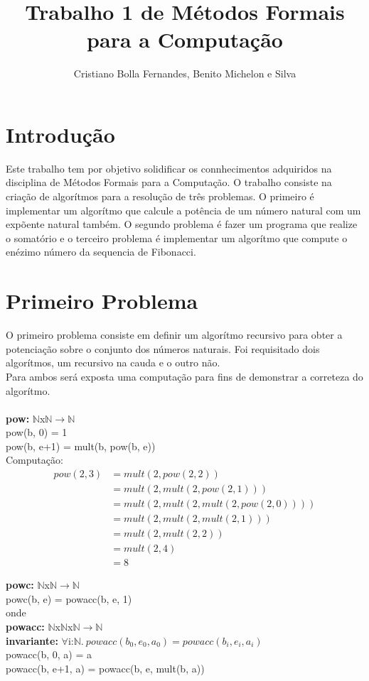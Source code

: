\documentclass{article}
\title{Trabalho 1 de Métodos Formais para a Computação}
\author{Cristiano Bolla Fernandes, Benito Michelon e Silva}
\begin{document}
\maketitle

\section{Introdução}
Este trabalho tem por objetivo solidificar os connhecimentos adquiridos na disciplina de Métodos Formais para a Computação.
O trabalho consiste na criação de algorítmos para a resolução de três problemas. O primeiro é implementar um algorítmo que calcule a
potência de um número natural com um expõente natural também. O segundo problema é fazer um programa que realize o somatório e o
terceiro problema é implementar um algorítmo que compute o enézimo número da sequencia de Fibonacci.

\section{Primeiro Problema}
O primeiro problema consiste em definir um algorítmo recursivo para obter a potenciação sobre o conjunto dos números naturais.
Foi requisitado dois algorítmos, um recursivo na cauda e o outro não.\\
Para ambos será exposta uma computação para fins de demonstrar a correteza do algorítmo.\\
\\
\textbf{pow:} $\mathbb{N}$x$\mathbb{N}$$ \rightarrow \mathbb{N}$\\
pow(b, 0) = 1\\
pow(b, e+1) = mult(b, pow(b, e))\\

Computação:\\
\begin{align*}
pow(2,3) &= mult(2, pow(2, 2))\\
&= mult(2, mult(2, pow(2, 1)))\\
&= mult(2, mult(2, mult(2, pow(2, 0))))\\
&= mult(2, mult(2, mult(2, 1)))\\
&= mult(2, mult(2, 2))\\
&= mult(2, 4)\\
&= 8
\end{align*}

\noindent \textbf{powc:} $\mathbb{N}$x$\mathbb{N}$$ \rightarrow \mathbb{N}$\\
powc(b, e) = powacc(b, e, 1)\\
onde\\
\indent \textbf{powacc:} $\mathbb{N}$x$\mathbb{N}$x$\mathbb{N}$$ \rightarrow \mathbb{N}$\\
\indent \textbf{invariante:} $\forall$i:$\mathbb{N}.\: powacc(b_0,e_0, a_0) = powacc(b_i, e_i, a_i)$\\
\indent powacc(b, 0, a) = a\\
\indent powacc(b, e+1, a) = powacc(b, e, mult(b, a))\\
\end{document}

